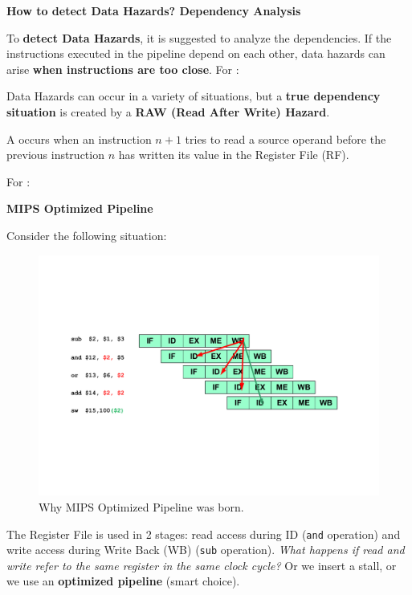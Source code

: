 \begin{flushleft}
    \textcolor{Green3}{ \textbf{How to detect Data Hazards? Dependency Analysis}}
\end{flushleft}
To \textbf{detect Data Hazards}, it is suggested to analyze the dependencies. If the instructions executed in the pipeline depend on each other, data hazards can arise \textbf{when instructions are too close}. For :

Data Hazards can occur in a variety of situations, but a \textbf{true dependency situation} is created by a \textbf{RAW (Read After Write) Hazard}.

\begin{definitionbox}
    A  occurs when an instruction $n+1$ tries to read a source operand before the previous instruction $n$ has written its value in the Register File (RF).
\end{definitionbox}

\noindent
For :


\begin{center}
    \large
    \textcolor{Red3}{\textbf{MIPS Optimized Pipeline}}
\end{center}
Consider the following situation:
\begin{figure}[!htp]
    \centering
    \includegraphics[width=\textwidth]{img/RAW-hazards-1.pdf}
    \caption{Why MIPS Optimized Pipeline was born.\cite{pipelining-slides}}
\end{figure}
The Register File is used in 2 stages: read access during ID (\texttt{and} operation) and write access during Write Back (WB) (\texttt{sub} operation). \emph{What happens if read and write refer to the same register in the same clock cycle?} Or we insert a stall, or we use an \textbf{optimized pipeline} (smart choice).

